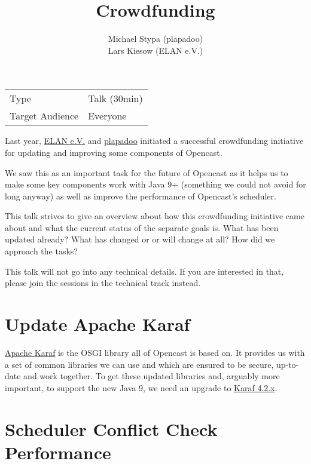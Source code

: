 \documentclass[a4paper]{article}
\title{Crowdfunding}
\author{
	Michael Stypa (plapadoo) \\
	Lars Kiesow (ELAN e.V.)
}
\begin{document}
\maketitle

\begin{center}
\begin{tabular}{ll}
\toprule
	Type            & Talk (30min) \\
	Target Audience & Everyone \\
\bottomrule
\end{tabular}
\end{center}

\vspace{1em}

Last year, \href{https://elan-ev.de}{ELAN e.V.} and
\href{https://plapadoo.com}{plapadoo} initiated a successful crowdfunding
initiative for updating and improving some components of Opencast.

We saw this as an important task for the future of Opencast as it helps us to
make some key components work with Java 9+ (something we could not avoid for
long anyway) as well as improve the performance of Opencast's scheduler.

This talk strives to give an overview about how this crowdfunding initiative
came about and what the current status of the separate goals is. What has been
updated already? What has changed or or will change at all? How did we approach
the tasks?

This talk will not go into any technical details. If you are interested in
that, please join the sessions in the technical track instead.


\section*{Update Apache Karaf}

\href{https://karaf.apache.org/}{Apache Karaf} is the OSGI library all of
Opencast is based on. It provides us with a set of common libraries we can use
and which are ensured to be secure, up-to-date and work together. To get these
updated libraries and, arguably more important, to support the new Java 9, we
need an upgrade to \href{https://karaf.apache.org/download.html}{Karaf 4.2.x}.


\section*{Scheduler Conflict Check Performance}
\end{document}

